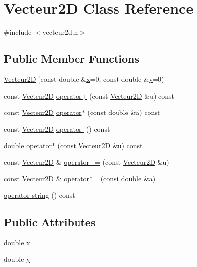 \hypertarget{class_vecteur2_d}{\section{Vecteur2\+D Class Reference}
\label{class_vecteur2_d}
}


{\ttfamily \#include $<$vecteur2d.\+h$>$}

\subsection*{Public Member Functions}
\begin{DoxyCompactItemize}
\item 
\hyperlink{class_vecteur2_d_ad9dee29de356e9bd4bee597dddf431b0}{Vecteur2\+D} (const double \&\hyperlink{class_vecteur2_d_a3a18b26b7d21dd930e3b0d22ba8ae4ee}{x}=0, const double \&\hyperlink{class_vecteur2_d_a3c8beeb57ed70e29fb603b46798a5d9e}{y}=0)
\item 
const \hyperlink{class_vecteur2_d}{Vecteur2\+D} \hyperlink{class_vecteur2_d_aace081ff5b7ee5f581e899cace973c4f}{operator+} (const \hyperlink{class_vecteur2_d}{Vecteur2\+D} \&u) const 
\item 
const \hyperlink{class_vecteur2_d}{Vecteur2\+D} \hyperlink{class_vecteur2_d_a8ad12c027bf86123bb49d1480d6ef7da}{operator$\ast$} (const double \&a) const 
\item 
const \hyperlink{class_vecteur2_d}{Vecteur2\+D} \hyperlink{class_vecteur2_d_a21842598e63169df7a3892751f5047ea}{operator-\/} () const 
\item 
double \hyperlink{class_vecteur2_d_a38badb5d6ca33c2be0fb24febabc54fd}{operator$\ast$} (const \hyperlink{class_vecteur2_d}{Vecteur2\+D} \&u) const 
\item 
const \hyperlink{class_vecteur2_d}{Vecteur2\+D} \& \hyperlink{class_vecteur2_d_a1d9bad0a209c91562afbbda7f6ece549}{operator+=} (const \hyperlink{class_vecteur2_d}{Vecteur2\+D} \&u)
\item 
const \hyperlink{class_vecteur2_d}{Vecteur2\+D} \& \hyperlink{class_vecteur2_d_ae23b19b97c95da5066b8b1976f3736b6}{operator$\ast$=} (const double \&a)
\item 
\hyperlink{class_vecteur2_d_aefc2f2b8874fdfa0c2467c1290c1c886}{operator string} () const 
\end{DoxyCompactItemize}
\subsection*{Public Attributes}
\begin{DoxyCompactItemize}
\item 
double \hyperlink{class_vecteur2_d_a3a18b26b7d21dd930e3b0d22ba8ae4ee}{x}
\item 
double \hyperlink{class_vecteur2_d_a3c8beeb57ed70e29fb603b46798a5d9e}{y}
\end{DoxyCompactItemize}


